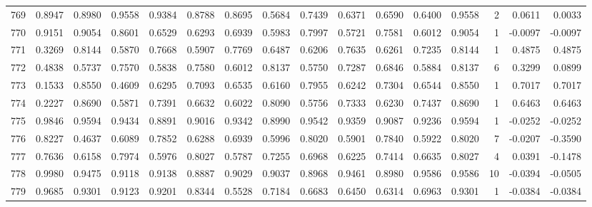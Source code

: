 \begin{tabular}{lrrrrrrrrrrrrrrr}
769 &      0.8947 &  0.8980 &  0.9558 &  0.9384 &  0.8788 &  0.8695 &  0.5684 &  0.7439 &  0.6371 &  0.6590 &   0.6400 &     0.9558 &      2 &                    0.0611 &                     0.0033 \\
770 &      0.9151 &  0.9054 &  0.8601 &  0.6529 &  0.6293 &  0.6939 &  0.5983 &  0.7997 &  0.5721 &  0.7581 &   0.6012 &     0.9054 &      1 &                   -0.0097 &                    -0.0097 \\
771 &      0.3269 &  0.8144 &  0.5870 &  0.7668 &  0.5907 &  0.7769 &  0.6487 &  0.6206 &  0.7635 &  0.6261 &   0.7235 &     0.8144 &      1 &                    0.4875 &                     0.4875 \\
772 &      0.4838 &  0.5737 &  0.7570 &  0.5838 &  0.7580 &  0.6012 &  0.8137 &  0.5750 &  0.7287 &  0.6846 &   0.5884 &     0.8137 &      6 &                    0.3299 &                     0.0899 \\
773 &      0.1533 &  0.8550 &  0.4609 &  0.6295 &  0.7093 &  0.6535 &  0.6160 &  0.7955 &  0.6242 &  0.7304 &   0.6544 &     0.8550 &      1 &                    0.7017 &                     0.7017 \\
774 &      0.2227 &  0.8690 &  0.5871 &  0.7391 &  0.6632 &  0.6022 &  0.8090 &  0.5756 &  0.7333 &  0.6230 &   0.7437 &     0.8690 &      1 &                    0.6463 &                     0.6463 \\
775 &      0.9846 &  0.9594 &  0.9434 &  0.8891 &  0.9016 &  0.9342 &  0.8990 &  0.9542 &  0.9359 &  0.9087 &   0.9236 &     0.9594 &      1 &                   -0.0252 &                    -0.0252 \\
776 &      0.8227 &  0.4637 &  0.6089 &  0.7852 &  0.6288 &  0.6939 &  0.5996 &  0.8020 &  0.5901 &  0.7840 &   0.5922 &     0.8020 &      7 &                   -0.0207 &                    -0.3590 \\
777 &      0.7636 &  0.6158 &  0.7974 &  0.5976 &  0.8027 &  0.5787 &  0.7255 &  0.6968 &  0.6225 &  0.7414 &   0.6635 &     0.8027 &      4 &                    0.0391 &                    -0.1478 \\
778 &      0.9980 &  0.9475 &  0.9118 &  0.9138 &  0.8887 &  0.9029 &  0.9037 &  0.8968 &  0.9461 &  0.8980 &   0.9586 &     0.9586 &     10 &                   -0.0394 &                    -0.0505 \\
779 &      0.9685 &  0.9301 &  0.9123 &  0.9201 &  0.8344 &  0.5528 &  0.7184 &  0.6683 &  0.6450 &  0.6314 &   0.6963 &     0.9301 &      1 &                   -0.0384 &                    -0.0384 \\

\end{tabular}
